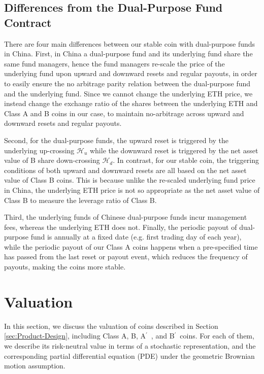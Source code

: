 \documentclass[draft, noinfoline]{ectaart}
\numberwithin{equation}{section}
\theoremstyle{plain}
\newcommand{\Ap}{A\ensuremath{^\prime}~}
\newcommand{\Bp}{B\ensuremath{^\prime}~}
\begin{document}
\subsection{Differences from the Dual-Purpose Fund Contract}

There are four main differences between our stable coin with dual-purpose funds in China. First, in China a dual-purpose fund and its underlying fund share the same fund managers, hence the fund managers re-scale the price of the underlying fund upon upward and downward resets and regular payouts, in order to easily ensure the no arbitrage parity relation between the dual-purpose fund and the underlying fund. Since we cannot change the underlying ETH price, we instead change the exchange ratio of the shares between the underlying ETH and Class A and B coins in our case, to maintain no-arbitrage across upward and downward resets and regular payouts.

 Second, for the dual-purpose funds, the upward reset is triggered by the underlying up-crossing $\mathcal{H}_u$ while the downward reset is triggered by the net asset value of B share down-crossing $\mathcal{H}_d$. In contrast, for our stable coin, the triggering conditions of both upward and downward resets are all based on the net asset value of Class B coins. This is because unlike the re-scaled underlying fund price in China, the underlying ETH price is not so appropriate as the net asset value of Class B to measure the leverage ratio of Class B.

 Third, the underlying funds of Chinese dual-purpose funds incur management fees, whereas the underlying ETH does not. Finally, the periodic payout of dual-purpose fund is annually at a fixed date (e.g. first trading day of each year), while the periodic payout of our Class A coins happens when a pre-specified time has passed from the last reset or payout event, which reduces the frequency of payouts, making the coins more stable.



\section{Valuation}\label{sect:valuation}

In this section, we discuss the valuation of coins described in Section \ref{sec:Product-Design}, including Class A, B, \Ap, and \Bp coins. For each of them, we describe its risk-neutral value in terms of a stochastic representation, and the corresponding partial differential equation (PDE) under the geometric Brownian motion assumption.
\end{document}
